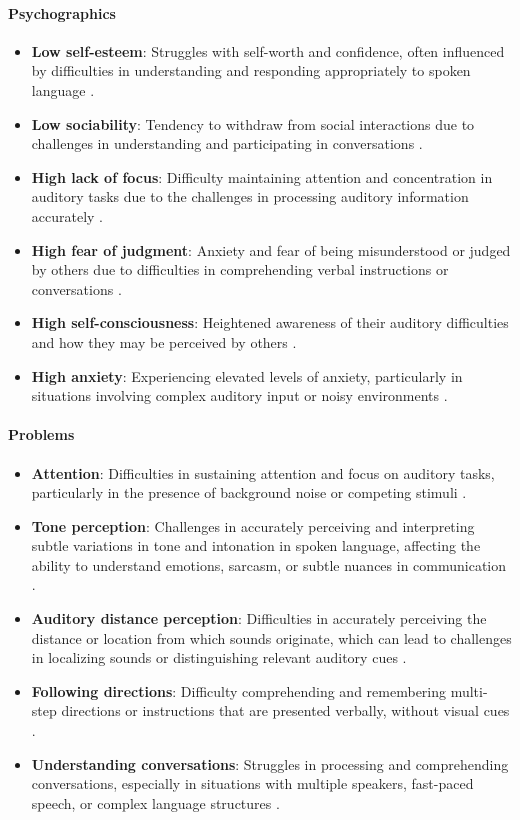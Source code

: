 \paragraph{Psychographics}
\begin{itemize}
    \item \textbf{Low self-esteem}: Struggles with self-worth and confidence, often influenced by difficulties in understanding and responding appropriately to spoken language \cite{KidsHealth}.
    \item \textbf{Low sociability}: Tendency to withdraw from social interactions due to challenges in understanding and participating in conversations \cite{KidsHealth}.
    \item \textbf{High lack of focus}: Difficulty maintaining attention and concentration in auditory tasks due to the challenges in processing auditory information accurately \cite{Nationwide}.
    \item \textbf{High fear of judgment}: Anxiety and fear of being misunderstood or judged by others due to difficulties in comprehending verbal instructions or conversations \cite{KidsHealth}.
    \item \textbf{High self-consciousness}: Heightened awareness of their auditory difficulties and how they may be perceived by others \cite{KidsHealth}.
    \item \textbf{High anxiety}: Experiencing elevated levels of anxiety, particularly in situations involving complex auditory input or noisy environments \cite{KidsHealth}.
\end{itemize}

\paragraph{Problems}
\begin{itemize}
    \item \textbf{Attention}: Difficulties in sustaining attention and focus on auditory tasks, particularly in the presence of background noise or competing stimuli \cite{HearingHealth}.
    \item \textbf{Tone perception}: Challenges in accurately perceiving and interpreting subtle variations in tone and intonation in spoken language, affecting the ability to understand emotions, sarcasm, or subtle nuances in communication \cite{Nationwide}.
    \item \textbf{Auditory distance perception}: Difficulties in accurately perceiving the distance or location from which sounds originate, which can lead to challenges in localizing sounds or distinguishing relevant auditory cues \cite{KidsHealth}.
    \item \textbf{Following directions}: Difficulty comprehending and remembering multi-step directions or instructions that are presented verbally, without visual cues \cite{Nationwide}.
    \item \textbf{Understanding conversations}: Struggles in processing and comprehending conversations, especially in situations with multiple speakers, fast-paced speech, or complex language structures \cite{Nationwide}.
\end{itemize}

